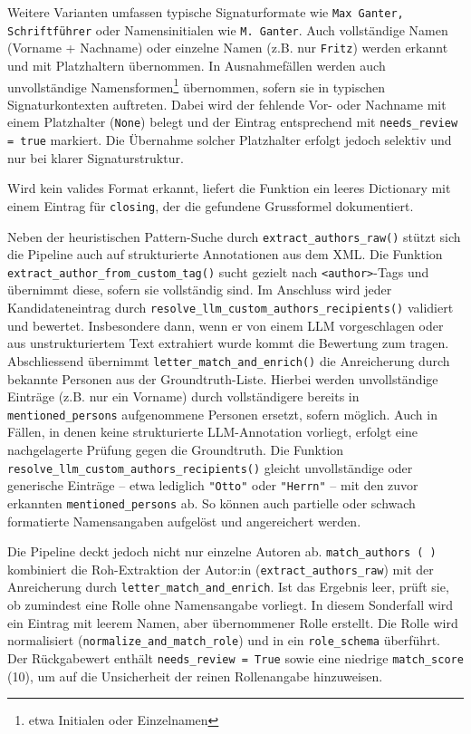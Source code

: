 \documentclass[12pt, a4paper, ngerman, bidi=default]{article}
\newcommand{\code}[1]{\colorbox{VeryLightGray}{\texttt{#1}}} %
\begin{document}
Weitere Varianten umfassen typische Signaturformate wie \texttt{Max Ganter, Schriftführer} oder Namensinitialen wie \texttt{M. Ganter}.
Auch vollständige Namen (Vorname + Nachname) oder einzelne Namen (z.B. nur \texttt{Fritz}) werden erkannt und mit Platzhaltern übernommen. In Ausnahmefällen werden auch unvollständige Namensformen\footnote{etwa Initialen oder Einzelnamen} übernommen, sofern sie in typischen Signaturkontexten auftreten. Dabei wird der fehlende Vor- oder Nachname mit einem Platzhalter (\code{None}) belegt und der Eintrag entsprechend mit \code{needs\_review = true} markiert. Die Übernahme solcher Platzhalter erfolgt jedoch selektiv und nur bei klarer Signaturstruktur.

Wird kein valides Format erkannt, liefert die Funktion ein leeres Dictionary mit einem Eintrag für \code{closing}, der die gefundene Grussformel dokumentiert.

Neben der heuristischen Pattern-Suche durch \code{extract\_authors\_raw()} stützt sich die Pipeline auch auf strukturierte Annotationen aus dem XML. Die Funktion \code{extract\_author\_from\_custom\_tag()} sucht gezielt nach \code{<author>}-Tags und übernimmt diese, sofern sie vollständig sind. Im Anschluss wird jeder Kandidateneintrag durch \code{resolve\_llm\_custom\_authors\_recipients()} validiert und bewertet. Insbesondere dann, wenn er von einem LLM vorgeschlagen oder aus unstrukturiertem Text extrahiert wurde kommt die Bewertung zum tragen. Abschliessend übernimmt \code{letter\_match\_and\_enrich()} die Anreicherung durch bekannte Personen aus der Groundtruth-Liste. Hierbei werden unvollständige Einträge (z.B. nur ein Vorname) durch vollständigere bereits in \code{mentioned\_persons} aufgenommene Personen ersetzt, sofern möglich. Auch in Fällen, in denen keine strukturierte LLM-Annotation vorliegt, erfolgt eine nachgelagerte Prüfung gegen die Groundtruth. Die Funktion \code{resolve\_llm\_custom\_authors\_recipients()} gleicht unvollständige oder generische Einträge – etwa lediglich \texttt{"Otto"} oder \texttt{"Herrn"} – mit den zuvor erkannten \code{mentioned\_persons} ab. So können auch partielle oder schwach formatierte Namensangaben aufgelöst und angereichert werden.

Die Pipeline deckt jedoch nicht nur einzelne Autoren ab. \code{match\_authors~(~)} kombiniert die Roh-Extraktion der Autor:in (\code{extract\_authors\_raw}) mit der Anreicherung durch \code{letter\_match\_and\_enrich}. Ist das Ergebnis leer, prüft sie, ob zumindest eine Rolle ohne Namensangabe vorliegt. In diesem Sonderfall wird ein Eintrag mit leerem Namen, aber übernommener Rolle erstellt. Die Rolle wird normalisiert (\code{normalize\_and\_match\_role}) und in ein \code{role\_schema} überführt. Der Rückgabewert enthält \code{needs\_review = True} sowie eine niedrige \code{match\_score} (10), um auf die Unsicherheit der reinen Rollenangabe hinzuweisen.
\end{document}
